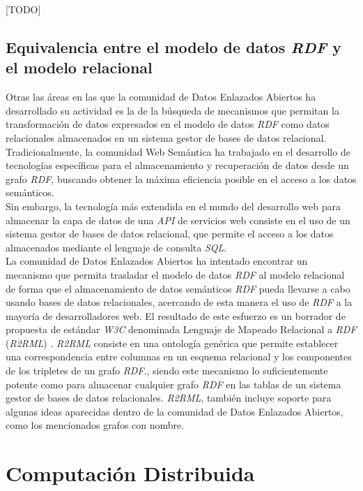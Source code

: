 [TODO]

\subsection{Equivalencia entre el modelo de datos \textit{RDF} y el modelo relacional}

Otras las \'areas en las que la comunidad de Datos Enlazados Abiertos ha desarrollado su actividad es la de la b\'usqueda de mecanismos que permitan la transformaci\'on de datos expresados en el modelo de datos \textit{RDF} como datos relacionales almacenados en un sistema gestor de bases de datos relacional.\\
Tradicionalmente, la comunidad Web Sem\'antica ha trabajado en el desarrollo de tecnolog\'ias espec\'ificas para el almacenamiento y recuperaci\'on de datos desde un grafo \textit{RDF}, buscando obtener la m\'axima eficiencia posible en el acceso a los datos sem\'anticos.\\
Sin embargo, la tecnolog\'ia m\'as extendida en el mundo del desarrollo web para almacenar la capa de datos de una \textit{API} de servicios web consiste en el uso de un sistema gestor de bases de datos relacional, que permite el acceso a los datos almacenados mediante el lenguaje de consulta \textit{SQL}.\\
La comunidad de Datos Enlazados Abiertos ha intentado encontrar un mecanismo que permita trasladar el modelo de datos \textit{RDF} al modelo relacional de forma que el almacenamiento de datos sem\'anticos \textit{RDF} pueda llevarse a cabo usando bases de datos relacionales, acercando de esta manera el uso de \textit{RDF} a la mayor\'ia de desarrolladores web.
El resultado de este esfuerzo es un borrador de propuesta de est\'andar \textit{W3C} denominada Lenguaje de Mapeado Relacional a \textit{RDF} (\textit{R2RML}) \cite{r2rml}. \textit{R2RML} consiste en una ontolog\'ia gen\'erica que permite establecer una correspondencia entre columnas en un esquema relacional y los componentes de los tripletes de un grafo \textit{RDF}., siendo este mecanismo lo suficientemente potente como para almacenar cualquier grafo \textit{RDF} en las tablas de un sistema gestor de bases de datos relacionales. \textit{R2RML}, tambi\'en incluye soporte para algunas ideas aparecidas dentro de la comunidad de Datos Enlazados Abiertos, como los mencionados grafos con nombre.


\section{Computaci\'on Distribuida}

